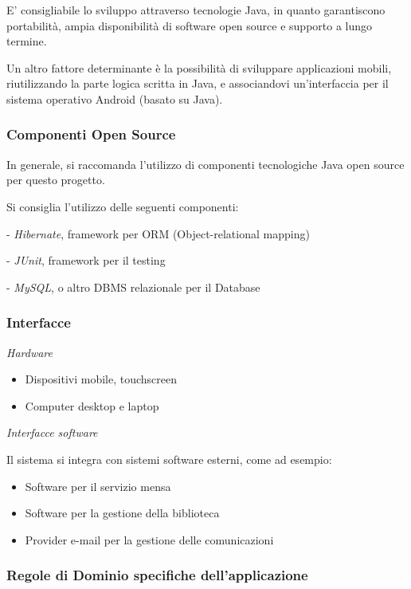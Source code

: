 E' consigliabile lo sviluppo attraverso tecnologie Java, in quanto garantiscono portabilità, ampia disponibilità di software open source e supporto a lungo termine.

Un altro fattore determinante è la possibilità di sviluppare applicazioni mobili, riutilizzando la parte logica scritta in Java, e associandovi un'interfaccia per il sistema operativo Android (basato su Java).

\subsubsection{Componenti Open Source}

In generale, si raccomanda l'utilizzo di componenti tecnologiche Java open source per questo progetto.

Si consiglia l'utilizzo delle seguenti componenti:

- \textit{Hibernate}, framework per ORM (Object-relational mapping)

- \textit{JUnit}, framework per il testing

- \textit{MySQL}, o altro DBMS relazionale per il Database

\subsubsection{Interfacce}

\textit{Hardware}

\begin{itemize}
	\item Dispositivi mobile, touchscreen
	\item Computer desktop e laptop
\end{itemize}

\textit{Interfacce software}

Il sistema si integra con sistemi software esterni, come ad esempio:

\begin{itemize}
	\item Software per il servizio mensa
	\item Software per la gestione della biblioteca
	\item Provider e-mail per la gestione delle comunicazioni
\end{itemize}

\newpage

\subsubsection{Regole di Dominio specifiche dell'applicazione}


